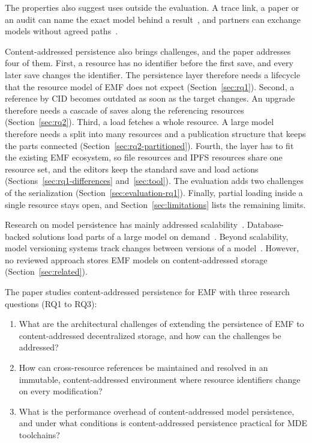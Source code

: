 \documentclass[5p,times,twocolumn]{elsarticle}
\theoremstyle{definition}
\theoremstyle{plain}
\begin{document}
The properties also suggest uses outside the evaluation. A trace link, a paper or an audit can name the exact model behind a result~\cite{lamb2022reproducible}, and partners can exchange models without agreed paths~\cite{dicosmo2017heritage}.

Content-addressed persistence also brings challenges, and the paper addresses four of them. First, a resource has no identifier before the first save, and every later save changes the identifier. The persistence layer therefore needs a lifecycle that the resource model of EMF does not expect (Section~\ref{sec:rq1}). Second, a reference by CID becomes outdated as soon as the target changes. An upgrade therefore needs a cascade of saves along the referencing resources (Section~\ref{sec:rq2}). Third, a load fetches a whole resource. A large model therefore needs a split into many resources and a publication structure that keeps the parts connected (Section~\ref{sec:rq2-partitioned}). Fourth, the layer has to fit the existing EMF ecosystem, so file resources and IPFS resources share one resource set, and the editors keep the standard save and load actions (Sections~\ref{sec:rq1-differences} and~\ref{sec:tool}). The evaluation adds two challenges of the serialization (Section~\ref{sec:evaluation-rq1}). Finally, partial loading inside a single resource stays open, and Section~\ref{sec:limitations} lists the remaining limits.

Research on model persistence has mainly addressed scalability~\cite{kolovos2013roadmap}. Database-backed solutions load parts of a large model on demand~\cite{pagan2015repository,daniel2017neoemf}. Beyond scalability, model versioning systems track changes between versions of a model~\cite{koegel2010emfstore,altmanninger2009survey}. However, no reviewed approach stores EMF models on content-addressed storage (Section~\ref{sec:related}).

The paper studies content-addressed persistence for EMF with three research questions (RQ1 to RQ3):

\begin{enumerate}
\item[RQ1] What are the architectural challenges of extending the persistence of EMF to content-addressed decentralized storage, and how can the challenges be addressed?
\item[RQ2] How can cross-resource references be maintained and resolved in an immutable, content-addressed environment where resource identifiers change on every modification?
\item[RQ3] What is the performance overhead of content-addressed model persistence, and under what conditions is content-addressed persistence practical for MDE toolchains?
\end{enumerate}
\end{document}
